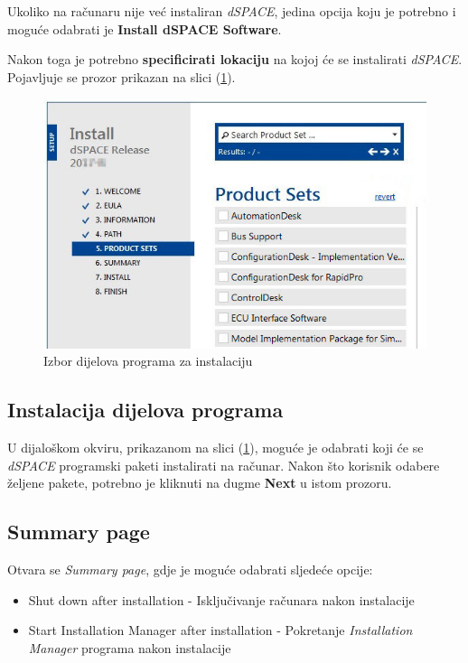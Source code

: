 Ukoliko na računaru nije već instaliran \textit{dSPACE}, jedina opcija koju je potrebno i moguće odabrati je \textbf{Install dSPACE Software}.

Nakon toga je potrebno \textbf{specificirati lokaciju} na kojoj će se instalirati \textit{dSPACE}. Pojavljuje se prozor prikazan na slici (\ref{fig:product.sets}).

\begin{figure}[h]
\begin{center}
\includegraphics[width=\textwidth]{slike/dSpace/product sets.png}
\end{center}
\caption{Izbor dijelova programa za instalaciju \citep{dSPACEinstall}}
\label{fig:product.sets}
\end{figure}

\subsection{Instalacija dijelova programa}

\qquad U dijaloškom okviru, prikazanom na slici (\ref{fig:product.sets}), moguće je odabrati koji će se \textit{dSPACE} programski paketi instalirati na računar. Nakon što korisnik odabere željene pakete, potrebno je kliknuti na dugme \textbf{Next} u istom prozoru.

\subsection{Summary page}

\qquad Otvara se \textit{Summary page}, gdje je moguće odabrati sljedeće opcije:

\begin{itemize}
	\item Shut down after installation - Isključivanje računara nakon instalacije
	\item Start Installation Manager after installation - Pokretanje \textit{Installation Manager} programa nakon instalacije
\end{itemize}

